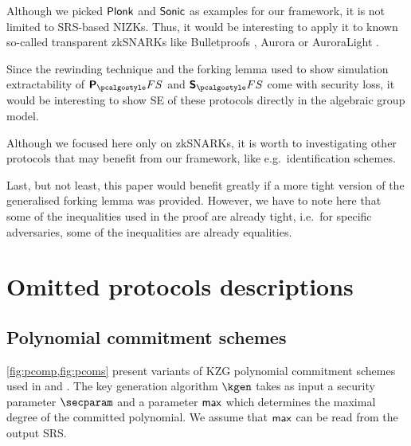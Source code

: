 \documentclass[runningheads,11pt]{llncs}
\begin{document}
Although we picked $\textnormal{\textsf{Plonk}}$ and ${\textnormal{\textsf{Sonic}}}$ as examples for our framework, it is
not limited to SRS-based NIZKs. Thus, it would be interesting to apply it to
known so-called transparent zkSNARKs like Bulletproofs \cite{SP:BBBPWM18},
Aurora \cite{EC:BCRSVW19} or AuroraLight \cite{EPRINT:Gabizon19a}.

Since the rewinding technique and the forking lemma used to show simulation
extractability of $\plonkprotfs$ and $\sonicprotfs$ come with security loss,
it would be interesting to show SE of these protocols directly in the
algebraic group model.

Although we focused here only on zkSNARKs, it is worth to
investigating other protocols that may benefit from our framework, like
e.g.~identification schemes.

Last, but not least, this paper would benefit greatly if a more tight version
of the generalised forking lemma was provided. However, we have to note here
that some of the inequalities used in the proof are already tight, i.e.~for
specific adversaries, some of the inequalities are already equalities.




\appendix

\section{Omitted protocols descriptions}
\subsection{Polynomial commitment schemes}
\label{sec:pcom}
\cref{fig:pcomp,fig:pcoms} present variants of KZG polynomial commitment schemes
used in \plonk{} and \sonic{}. The key generation algorithm $\kgen$ takes as
input a security parameter $\secparam$ and a parameter $\mathsf{max}$ which
determines the maximal degree of the committed polynomial. We assume that
$\mathsf{max}$ can be read from the output SRS.
\end{document}
